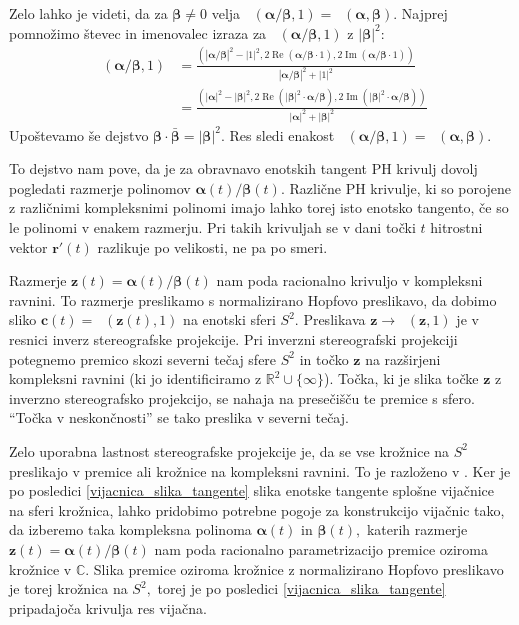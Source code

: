\documentclass[12pt,a4paper,twoside]{article}
\theoremstyle{definition} %
\theoremstyle{plain} %
\theoremstyle{primerstyle}
\numberwithin{equation}{section}  %
\newcommand{\R}{\mathbb R}
\renewcommand{\C}{\mathbb C}
\newcommand{\cV}{\mathbf{c}}
\newcommand{\rV}{\mathbf{r}}
\newcommand{\zV}{\mathbf{z}}
\newcommand{\balpha}{\boldsymbol \alpha}
\newcommand{\bbeta}{\boldsymbol \beta}
\DeclareMathOperator{\ReC}{Re}
\DeclareMathOperator{\ImC}{Im}
\DeclareMathOperator{\nhopf}{\hat{H}}
\begin{document}
Zelo lahko je videti, da za $\bbeta\neq0$ velja $\nhopf(\balpha/\bbeta,1)=\nhopf(\balpha,\bbeta).$ Najprej pomnožimo števec in imenovalec izraza za $\nhopf(\balpha/\bbeta,1)$ z $|\bbeta|^2:$
\begin{align*}
	\nhopf\left(\balpha/\bbeta,1\right)&=\frac{(|\balpha/\bbeta|^2-|1|^2,2\ReC(\balpha/\bbeta\cdot 1),2\ImC(\balpha/\bbeta\cdot 1))}{|\balpha/\bbeta|^2+|1|^2}\\
	&=\frac{(|\balpha|^2-|\bbeta|^2,2\ReC(|\bbeta|^2\cdot\balpha/\bbeta),2\ImC(|\bbeta|^2\cdot\balpha/\bbeta))}{|\balpha|^2+|\bbeta|^2}
\end{align*}
Upoštevamo še dejstvo $\bbeta\cdot\bar{\bbeta}=|\bbeta|^2.$ Res sledi enakost $\nhopf(\balpha/\bbeta,1)=\nhopf(\balpha,\bbeta).$

To dejstvo nam pove, da je za obravnavo enotskih tangent PH krivulj dovolj pogledati razmerje polinomov $\balpha(t)/\bbeta(t).$ Različne PH krivulje, ki so porojene z različnimi kompleksnimi polinomi imajo lahko torej isto enotsko tangento, če so le polinomi v enakem razmerju. Pri takih krivuljah se v dani točki $t$ hitrostni vektor $\rV'(t)$ razlikuje po velikosti, ne pa po smeri.

Razmerje $\zV(t)=\balpha(t)/\bbeta(t)$ nam poda racionalno krivuljo v kompleksni ravnini. To razmerje preslikamo s normalizirano Hopfovo preslikavo, da dobimo sliko $\cV(t)=\nhopf(\zV(t),1)$ na enotski sferi $S^2.$ Preslikava $\zV\to\nhopf(\zV,1)$ je v resnici inverz stereografske projekcije. Pri inverzni stereografski projekciji potegnemo premico skozi severni tečaj sfere $S^2$ in točko $\zV$ na razširjeni kompleksni ravnini (ki jo identificiramo z $\R^2\cup\{\infty\}$). Točka, ki je slika točke $\zV$ z inverzno stereografsko projekcijo, se nahaja na presečišču te premice s sfero. ``Točka v neskončnosti'' se tako preslika v severni tečaj.

Zelo uporabna lastnost stereografske projekcije je, da se vse krožnice na $S^2$ preslikajo v premice ali krožnice na kompleksni ravnini. To je razloženo v \cite[pogl.\ ``Stereographic projection'']{needham1998visual}. Ker je po posledici \ref{vijacnica_slika_tangente} slika enotske tangente splošne vijačnice na sferi krožnica, lahko pridobimo potrebne pogoje za konstrukcijo vijačnic tako, da izberemo taka kompleksna polinoma $\balpha(t)$ in $\bbeta(t),$ katerih razmerje $\zV(t)=\balpha(t)/\bbeta(t)$ nam poda racionalno parametrizacijo premice oziroma krožnice v $\C.$ Slika premice oziroma krožnice z normalizirano Hopfovo preslikavo je torej krožnica na $S^2,$ torej je po posledici \ref{vijacnica_slika_tangente} pripadajoča krivulja res vijačna.
\end{document}
